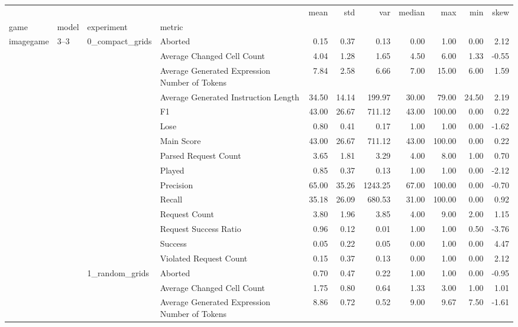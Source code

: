 \begin{tabular}{llllrrrrrrr}
\toprule
 &  &  &  & mean & std & var & median & max & min & skew \\
game & model & experiment & metric &  &  &  &  &  &  &  \\
\midrule
\multirow[t]{330}{*}{imagegame} & \multirow[t]{30}{*}{3--3} & \multirow[t]{15}{*}{0_compact_grids} & Aborted & 0.15 & 0.37 & 0.13 & 0.00 & 1.00 & 0.00 & 2.12 \\
 &  &  & Average Changed Cell Count & 4.04 & 1.28 & 1.65 & 4.50 & 6.00 & 1.33 & -0.55 \\
 &  &  & Average Generated Expression Number of Tokens & 7.84 & 2.58 & 6.66 & 7.00 & 15.00 & 6.00 & 1.59 \\
 &  &  & Average Generated Instruction Length & 34.50 & 14.14 & 199.97 & 30.00 & 79.00 & 24.50 & 2.19 \\
 &  &  & F1 & 43.00 & 26.67 & 711.12 & 43.00 & 100.00 & 0.00 & 0.22 \\
 &  &  & Lose & 0.80 & 0.41 & 0.17 & 1.00 & 1.00 & 0.00 & -1.62 \\
 &  &  & Main Score & 43.00 & 26.67 & 711.12 & 43.00 & 100.00 & 0.00 & 0.22 \\
 &  &  & Parsed Request Count & 3.65 & 1.81 & 3.29 & 4.00 & 8.00 & 1.00 & 0.70 \\
 &  &  & Played & 0.85 & 0.37 & 0.13 & 1.00 & 1.00 & 0.00 & -2.12 \\
 &  &  & Precision & 65.00 & 35.26 & 1243.25 & 67.00 & 100.00 & 0.00 & -0.70 \\
 &  &  & Recall & 35.18 & 26.09 & 680.53 & 31.00 & 100.00 & 0.00 & 0.92 \\
 &  &  & Request Count & 3.80 & 1.96 & 3.85 & 4.00 & 9.00 & 2.00 & 1.15 \\
 &  &  & Request Success Ratio & 0.96 & 0.12 & 0.01 & 1.00 & 1.00 & 0.50 & -3.76 \\
 &  &  & Success & 0.05 & 0.22 & 0.05 & 0.00 & 1.00 & 0.00 & 4.47 \\
 &  &  & Violated Request Count & 0.15 & 0.37 & 0.13 & 0.00 & 1.00 & 0.00 & 2.12 \\
\cline{3-11}
 &  & \multirow[t]{15}{*}{1_random_grids} & Aborted & 0.70 & 0.47 & 0.22 & 1.00 & 1.00 & 0.00 & -0.95 \\
 &  &  & Average Changed Cell Count & 1.75 & 0.80 & 0.64 & 1.33 & 3.00 & 1.00 & 1.01 \\
 &  &  & Average Generated Expression Number of Tokens & 8.86 & 0.72 & 0.52 & 9.00 & 9.67 & 7.50 & -1.61 \\

\end{tabular}
